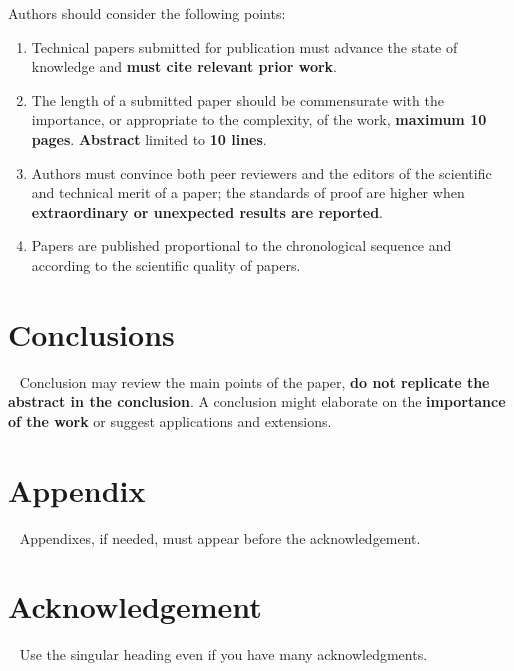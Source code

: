 \documentclass[english]{MSRarticle}
\begin{document}
Authors should consider the following points:
\begin{enumerate}
	\item 
	Technical papers submitted for publication must advance the state of knowledge and \textbf{must cite relevant prior work}.
	
	\item 
	The length of a submitted paper should be commensurate with the importance, or appropriate to the complexity, of the work, \textbf{maximum 10 pages}. \textbf{Abstract} limited to \textbf{10 lines}.
	
	\item 
	Authors must convince both peer reviewers and the editors of the scientific and technical merit of a paper; the standards of proof are higher when \textbf{extraordinary or unexpected results are reported}.
	
	\item 
	Papers are published proportional to the chronological sequence and according to the scientific quality of papers.
\end{enumerate}

\section{Conclusions}
\
\indent
Conclusion may review the main points of the paper, \textbf{do not replicate the abstract in the conclusion}. A conclusion might elaborate on the \textbf{importance of the work} or suggest applications and extensions.

\section*{Appendix}
\
\indent
Appendixes, if needed, must appear before the acknowledgement.

\section*{Acknowledgement}
\
\indent
Use the singular heading even if you have many acknowledgments.



% 
% 

\end{document}

